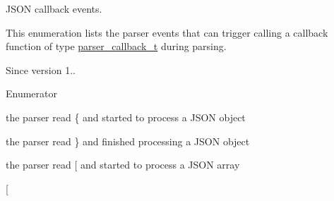 J\-S\-O\-N callback events. 

This enumeration lists the parser events that can trigger calling a callback function of type \hyperlink{classnlohmann_1_1basic__json_a9e35475e2027520a78e09f460dbe048a}{parser\-\_\-callback\-\_\-t} during parsing.

\begin{DoxySince}{Since}
version 1.. 
\end{DoxySince}
\begin{Desc}
\item[Enumerator]\par
\begin{description}
\item[{\em 
\hypertarget{classnlohmann_1_1basic__json_aea1c863b719b4ca5b77188c171bbfafeae73f17027cb0acbb537f29d0a6944b26}{object\-\_\-start}\label{classnlohmann_1_1basic__json_aea1c863b719b4ca5b77188c171bbfafeae73f17027cb0acbb537f29d0a6944b26}
}]the parser read {\ttfamily \{} and started to process a J\-S\-O\-N object \item[{\em 
\hypertarget{classnlohmann_1_1basic__json_aea1c863b719b4ca5b77188c171bbfafeaf63e2a2468a37aa4f394fcc3bcb8249c}{object\-\_\-end}\label{classnlohmann_1_1basic__json_aea1c863b719b4ca5b77188c171bbfafeaf63e2a2468a37aa4f394fcc3bcb8249c}
}]the parser read {\ttfamily \}} and finished processing a J\-S\-O\-N object \item[{\em 
\hypertarget{classnlohmann_1_1basic__json_aea1c863b719b4ca5b77188c171bbfafeaa4388a3d92419edbb1c6efd4d52461f3}{array\-\_\-start}\label{classnlohmann_1_1basic__json_aea1c863b719b4ca5b77188c171bbfafeaa4388a3d92419edbb1c6efd4d52461f3}
}]the parser read {\ttfamily \mbox{[}} and started to process a J\-S\-O\-N array \item[{\em 
}
\end{description}
\end{Desc}
